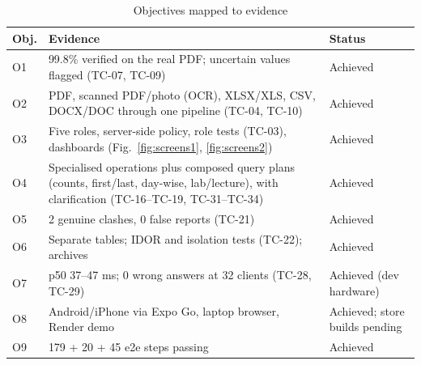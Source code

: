 \begin{table}[H]
\centering
\caption{Objectives mapped to evidence}
\label{tab:objectives}
\small
\begin{tabularx}{\textwidth}{@{}p{0.8cm}Xp{1.9cm}@{}}
\toprule
\textbf{Obj.} & \textbf{Evidence} & \textbf{Status}\\
\midrule
O1 & 99.8\% verified on the real PDF; uncertain values flagged (TC-07, TC-09) & Achieved\\
O2 & PDF, scanned PDF/photo (OCR), XLSX/XLS, CSV, DOCX/DOC through one pipeline (TC-04, TC-10) & Achieved\\
O3 & Five roles, server-side policy, role tests (TC-03), dashboards (Fig.~\ref{fig:screens1}, \ref{fig:screens2}) & Achieved\\
O4 & Specialised operations plus composed query plans (counts, first/last, day-wise, lab/lecture), with clarification (TC-16--TC-19, TC-31--TC-34) & Achieved\\
O5 & 2 genuine clashes, 0 false reports (TC-21) & Achieved\\
O6 & Separate tables; IDOR and isolation tests (TC-22); archives & Achieved\\
O7 & p50 37--47 ms; 0 wrong answers at 32 clients (TC-28, TC-29) & Achieved (dev hardware)\\
O8 & Android/iPhone via Expo Go, laptop browser, Render demo & Achieved; store builds pending\\
O9 & 179 + 20 + 45 e2e steps passing & Achieved\\
\bottomrule
\end{tabularx}
\end{table}
